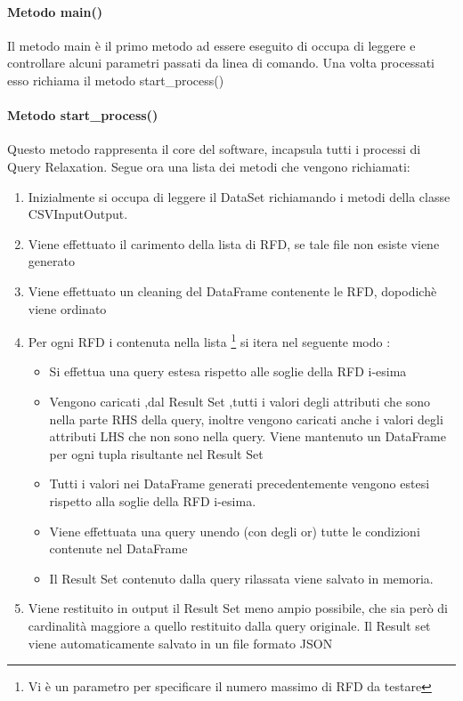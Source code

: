 \paragraph{Metodo main()}
Il metodo main è il primo metodo ad essere eseguito di occupa di leggere e controllare alcuni parametri passati da linea di comando. Una volta processati esso richiama il metodo start{\_}process()

\paragraph{Metodo start{\_}process()}
Questo metodo rappresenta il core del software, incapsula tutti i processi di Query Relaxation.
Segue ora una lista dei metodi che vengono richiamati:
\begin{enumerate}
    \item Inizialmente si occupa di leggere il DataSet richiamando i metodi della classe CSVInputOutput.
    \item Viene effettuato il carimento della lista di RFD, se tale file non esiste viene generato
    \item Viene effettuato un cleaning del DataFrame contenente le RFD, dopodichè viene ordinato
    \item Per ogni RFD i contenuta nella lista \footnote{Vi è un parametro per specificare il numero massimo di RFD da testare} si itera nel seguente modo :
    \begin{itemize}
        \item Si effettua una query estesa rispetto alle soglie della RFD i-esima
        \item Vengono caricati ,dal Result Set ,tutti i valori degli attributi che sono nella parte RHS della query, inoltre vengono caricati anche i valori degli attributi LHS che non sono nella query. Viene mantenuto un DataFrame per ogni tupla risultante nel Result Set
        \item Tutti i valori nei DataFrame generati precedentemente vengono estesi rispetto alla soglie della RFD i-esima.
        \item Viene effettuata una query unendo (con degli or) tutte le condizioni contenute nel DataFrame
        \item Il Result Set contenuto dalla query rilassata viene salvato in memoria.
    \end{itemize}
    \item Viene restituito in output il Result Set meno ampio possibile, che sia però di cardinalità maggiore a quello restituito dalla query originale. Il Result set viene automaticamente salvato in un file formato JSON
\end{enumerate}


